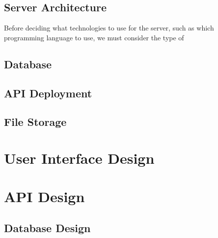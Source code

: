 \subsection{Server Architecture}

Before deciding what technologies to use for the server, such as which programming language to use, we must consider the type of 

\subsection{Database}

\subsection{API Deployment}

\subsection{File Storage}


\section{User Interface Design}


\section{API Design}


\subsection{Database Design}

